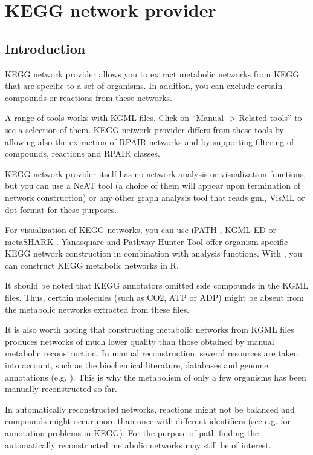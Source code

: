 \chapter{KEGG network provider}

\section{Introduction}

KEGG network provider allows you to extract metabolic networks from KEGG \cite{Kanehisa2008} that are specific to a set of organisms.
In addition, you can exclude certain compounds or reactions from these networks.

A range of tools works with KGML files. Click on ``Manual -> Related tools'' to see a selection of them.
KEGG network provider differs from these tools by allowing also the extraction of RPAIR networks and by supporting
filtering of compounds, reactions and RPAIR classes.

KEGG network provider itself has no network analysis or visualization functions,
but you can use a NeAT tool (a choice of them will appear upon termination of network construction)
or any other graph analysis tool that reads gml, VisML or dot format for these purposes.

For visualization of KEGG networks, you can use iPATH \cite{ipath}, KGML-ED \cite{kgmled} or
metaSHARK \cite{metashark}.
Yanasquare \cite{yana} and Pathway Hunter Tool \cite{pht} offer
organism-specific KEGG network construction in combination
with analysis functions. With \cite{kegggrah}, you can construct KEGG metabolic networks in R.

It should be noted that KEGG annotators omitted side compounds in the KGML files. Thus, certain molecules
(such as CO2, ATP or ADP) might be absent from the metabolic networks extracted from these files.

It is also worth noting that constructing metabolic networks from KGML
files produces networks of much lower quality than those obtained by
manual metabolic reconstruction. In manual reconstruction, several
resources are taken into account, such as the biochemical literature,
databases and genome annotations (e.g. \cite{Foerster2003}). This is
why the metabolism of only a few organisms has been manually
reconstructed so far.

In automatically reconstructed networks, reactions might not be
balanced and compounds might occur more than once with different
identifiers (see e.g. \cite{Poolman2006} for annotation problems in
KEGG).  For the purpose of path finding the automatically
reconstructed metabolic networks may still be of interest.

